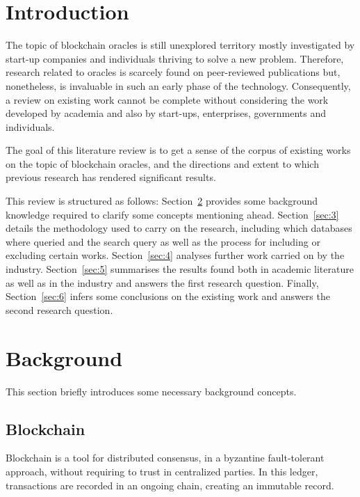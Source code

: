 \documentclass[final,3p,12pt,twocolumn]{elsarticle}
\begin{document}

\section{Introduction}

The topic of blockchain oracles is still unexplored territory mostly investigated by start-up companies and individuals thriving to solve a new problem. Therefore, research related to oracles is scarcely found on peer-reviewed publications but, nonetheless, is invaluable in such an early phase of the technology. Consequently, a review on existing work cannot be complete without considering the work developed by academia and also by start-ups, enterprises, governments and individuals.

The goal of this literature review is to get a sense of the corpus of existing works on the topic of blockchain oracles, and the directions and extent to which previous research has rendered significant results.

This review is structured as follows: Section~\ref{sec:2} provides some background knowledge required to clarify some concepts mentioning ahead. Section~\ref{sec:3} details the methodology used to carry on the research, including which databases where queried and the search query as well as the process for including or excluding certain works. Section~\ref{sec:4} analyses further work carried on by the industry. Section~\ref{sec:5} summarises the results found both in academic literature as well as in the industry and answers the first research question. Finally, Section~\ref{sec:6} infers some conclusions on the existing work and answers the second research question.



\section{Background}\label{sec:2}

This section briefly introduces some necessary background concepts.

\subsection{Blockchain}
Blockchain is a tool for distributed consensus, in a byzantine fault-tolerant approach, without requiring to trust in centralized parties. In this ledger, transactions are recorded in an ongoing chain, creating an immutable record.
\end{document}
